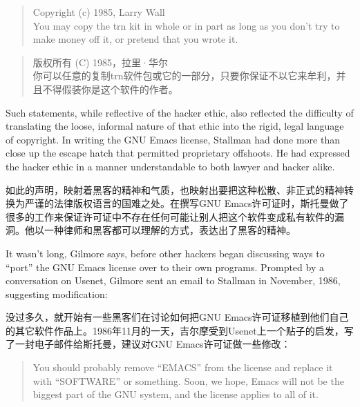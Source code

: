 \ifdefined\eng
\begin{quote}
Copyright (c) 1985, Larry Wall\\
You may copy the trn kit in whole or in part as long as you don't try to make money off it, or pretend that you wrote it.
\end{quote}
\fi

\ifdefined\chs
\begin{quote}
版权所有 (C) 1985，拉里·华尔\\
你可以任意的复制trn软件包或它的一部分，只要你保证不以它来牟利，并且不得假装你是这个软件的作者。
\end{quote}
\fi

\ifdefined\eng
Such statements, while reflective of the hacker ethic, also reflected the difficulty of translating the loose, informal nature of that ethic into the rigid, legal language of copyright. In writing the GNU Emacs license, Stallman had done more than close up the escape hatch that permitted proprietary offshoots. He had expressed the hacker ethic in a manner understandable to both lawyer and hacker alike.
\fi

\ifdefined\chs
如此的声明，映射着黑客的精神和气质，也映射出要把这种松散、非正式的精神转换为严谨的法律版权语言的国难之处。在撰写GNU Emacs许可证时，斯托曼做了很多的工作来保证许可证中不存在任何可能让别人把这个软件变成私有软件的漏洞。他以一种律师和黑客都可以理解的方式，表达出了黑客的精神。
\fi

\ifdefined\eng
It wasn't long, Gilmore says, before other hackers began discussing ways to ``port'' the GNU Emacs license over to their own programs. Prompted by a conversation on Usenet, Gilmore sent an email to Stallman in November, 1986, suggesting modification:
\fi

\ifdefined\chs
没过多久，就开始有一些黑客们在讨论如何把GNU Emacs许可证移植到他们自己的其它软件作品上。1986年11月的一天，吉尔摩受到Usenet上一个贴子的启发，写了一封电子邮件给斯托曼，建议对GNU Emacs许可证做一些修改：
\fi

\ifdefined\eng
\begin{quote}
You should probably remove ``EMACS'' from the license and replace it with ``SOFTWARE'' or something. Soon, we hope, Emacs will not be the biggest part of the GNU system, and the license applies to all of it.
\end{quote}
\fi

